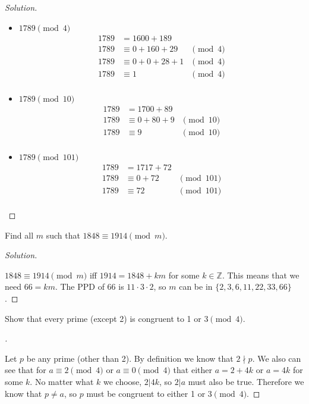 \documentclass[11pt]{article}
\newcommand{\Z}{\mathbb{Z}}
\newcommand{\ndiv}{\nmid}
\newenvironment{myproof}[1][\proofname]{%
  \begin{proof}[#1]$ $\par\nobreak\ignorespaces
}{%
  \end{proof}
}
\newenvironment{problem}[2][Problem]{\begin{trivlist}
\item[\hskip \labelsep {\bfseries #1}\hskip \labelsep {\bfseries #2.}]}{\end{trivlist}}
\newenvironment{solution}
  {\renewcommand\qedsymbol{$~$}\begin{proof}[Solution]$ $\par\nobreak\ignorespaces}
  {\end{proof}}
\begin{document}
\begin{solution}
  \begin{itemize}
    \item $1789 \pmod{4}$
          \begin{align*}
            1789 & = 1600 + 189                     \\
            1789 & \equiv 0 + 160 + 29   & \pmod{4} \\
            1789 & \equiv 0 + 0 + 28 + 1 & \pmod{4} \\
            1789 & \equiv  1             & \pmod{4} \\
          \end{align*}
    \item $1789 \pmod{10}$
          \begin{align*}
            1789 & = 1700 + 89                   \\
            1789 & \equiv 0 + 80 + 9 & \pmod{10} \\
            1789 & \equiv  9         & \pmod{10} \\
          \end{align*}
    \item $1789 \pmod{101}$
          \begin{align*}
            1789 & = 1717 + 72                \\
            1789 & \equiv 0 + 72 & \pmod{101} \\
            1789 & \equiv 72     & \pmod{101} \\
          \end{align*}
  \end{itemize}
\end{solution}



\begin{problem}{6}
Find all $m$ such that $1848 \equiv 1914 \pmod{m}.$
\end{problem}

\begin{solution}
  $1848 \equiv 1914 \pmod{m}$ iff $1914=1848 + km$ for some $k\in\Z$. This means that we need $66=km$. The PPD of 66 is $11\cdot 3 \cdot 2$, so $m$ can be in $\{2,3,6,11,22,33,66\}$.
\end{solution}


\begin{problem}{8}
Show that every prime (except 2) is congruent to 1 or 3$\pmod{4}$.
\end{problem}

\begin{myproof}
  Let $p$ be any prime (other than 2). By definition we know that $2 \ndiv p$. We also can see that for $a\equiv 2\pmod{4}$ or $a\equiv 0\pmod{4}$ that either $a=2 +4k$ or $a=4k$ for some $k$. No matter what $k$ we choose, $2|4k$, so $2|a$ must also be true. Therefore we know that $p\neq a$, so $p$ must be congruent to either 1 or 3$\pmod{4}$.
\end{myproof}
\end{document}
